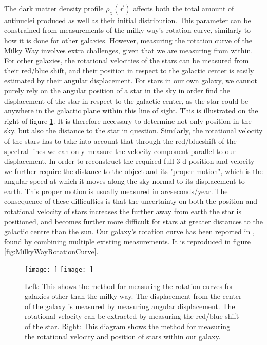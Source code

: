 The dark matter density profile $\rho_\chi(\vec{r})$ affects both the total amount of antinuclei produced as well as their initial distribution. This parameter can be constrained from measurements of the milky way's rotation curve, similarly to how it is done for other galaxies. However, measuring the rotation curve of the Milky Way involves extra challenges, given that we are measuring from within. For other galaxies, the rotational velocities of the stars can be measured from their red/blue shift, and their position in respect to the galactic center is easily estimated by their angular displacement. For stars in our own galaxy, we cannot purely rely on the angular position of a star in the sky in order find the displacement of the star in respect to the galactic center, as the star could be anywhere in the galactic plane within this line of sight. This is illustrated on the right of figure \ref{fig:measuringDarkMatterProfiles}. It is therefore necessary to determine not only position in the sky, but also the distance to the star in question. Similarly, the rotational velocity of the stars has to take into account that through the red/blueshift of the spectral lines we can only measure the velocity component parallel to our displacement. In order to reconstruct the required full 3-d position and velocity we further require the distance to the object and its "proper motion", which is the angular speed at which it moves along the sky normal to its displacement to earth. This proper motion is usually measured in arcseconds/year. The consequence of these difficulties is that the uncertainty on both the position and rotational velocity of stars increases the further away from earth the star is positioned, and becomes further more difficult for stars at greater distances to the galactic centre than the sun. Our galaxy's rotation curve  has been reported in \cite{}, found by combining multiple existing measurements. It is reproduced in figure \ref{fig:MilkyWayRotationCurve}. \\

\begin{figure}[h]
    \centering
    \texttt{[image: ]}
    \texttt{[image: ]}
    \caption{Left: This shows the method for measuring the rotation curves for galaxies other than the milky way. The displacement from the center of the galaxy is measured by measuring angular displacement. The rotational velocity can be extracted by measuring the red/blue shift of the star\cite{}. Right: This diagram shows the method for measuring the rotational velocity and position of stars within our galaxy.}
    \label{fig:measuringDarkMatterProfiles}
\end{figure}


